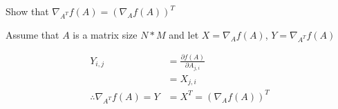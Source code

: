 \documentclass[12pt, a4paper]{article}
\begin{document}
Show that $\nabla_{A^{T}}f(A) = (\nabla_{A}f(A))^{T}$

Assume that $A$ is a matrix size $N * M$ and let $X = \nabla_{A}f(A)$, $Y = \nabla_{A^{T}}f(A)$

\begin{equation}
    \begin{split}
        Y_{i,j} &= \frac{\partial f(A)}{\partial A_{j,i}} \\
                &= X_{j,i} \\
        \therefore \nabla_{A^{T}}f(A) = Y &= X^{T} = (\nabla_{A}f(A))^{T}
    \end{split}
\end{equation}
\end{document}
